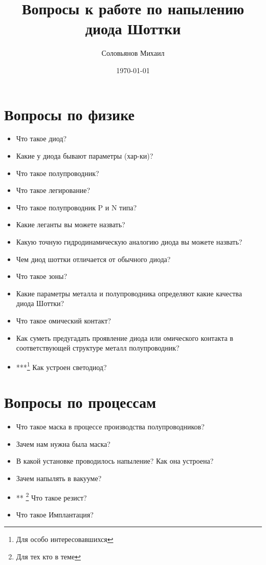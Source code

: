 \documentclass[a4paper,12pt]{article} %
\author{Соловьянов Михаил}
\title{Вопросы к работе по напылению диода Шоттки}
\date{\today}
\begin{document}
\maketitle


\section{Вопросы по физике}
\begin{itemize}
  \item Что такое диод?
  \item Какие у диода бывают параметры (хар-ки)?
  \item Что такое полупроводник?
  \item Что такое легирование?
  \item Что такое полупроводник P и N типа?
  \item Какие леганты вы можете назвать?
  \item Какую точную гидродинамическую аналогию диода вы можете назвать?
  \item Чем диод шоттки отличается от обычного диода?
  \item Что такое зоны?
  \item Какие параметры металла и полупроводника определяют какие качества диода Шоттки?
  \item Что такое омический контакт?
  \item Как суметь предугадать проявление диода или омического контакта в соответствующей структуре металл полупроводник?
  \item ***\footnote{Для особо интересовавшихся} Как устроен светодиод?
\end{itemize}

\section{Вопросы по процессам}

\begin{itemize}
  \item Что такое маска в процессе производства полупроводников?
  \item Зачем нам нужна была маска?
  \item В какой установке проводилось напыление? Как она устроена?
  \item Зачем напылять в вакууме?
  \item ** \footnote{Для тех кто в теме} Что такое резист?
  \item Что такое Имплантация?
\end{itemize}
\end{document}
